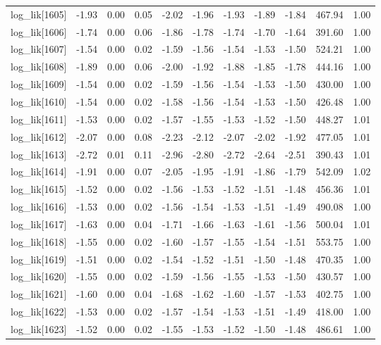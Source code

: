\begin{table}[ht]
\begin{tabular}{rrrrrrrrrrr}
  log\_lik[1605] & -1.93 & 0.00 & 0.05 & -2.02 & -1.96 & -1.93 & -1.89 & -1.84 & 467.94 & 1.00 \\ 
  log\_lik[1606] & -1.74 & 0.00 & 0.06 & -1.86 & -1.78 & -1.74 & -1.70 & -1.64 & 391.60 & 1.00 \\ 
  log\_lik[1607] & -1.54 & 0.00 & 0.02 & -1.59 & -1.56 & -1.54 & -1.53 & -1.50 & 524.21 & 1.00 \\ 
  log\_lik[1608] & -1.89 & 0.00 & 0.06 & -2.00 & -1.92 & -1.88 & -1.85 & -1.78 & 444.16 & 1.00 \\ 
  log\_lik[1609] & -1.54 & 0.00 & 0.02 & -1.59 & -1.56 & -1.54 & -1.53 & -1.50 & 430.00 & 1.00 \\ 
  log\_lik[1610] & -1.54 & 0.00 & 0.02 & -1.58 & -1.56 & -1.54 & -1.53 & -1.50 & 426.48 & 1.00 \\ 
  log\_lik[1611] & -1.53 & 0.00 & 0.02 & -1.57 & -1.55 & -1.53 & -1.52 & -1.50 & 448.27 & 1.01 \\ 
  log\_lik[1612] & -2.07 & 0.00 & 0.08 & -2.23 & -2.12 & -2.07 & -2.02 & -1.92 & 477.05 & 1.01 \\ 
  log\_lik[1613] & -2.72 & 0.01 & 0.11 & -2.96 & -2.80 & -2.72 & -2.64 & -2.51 & 390.43 & 1.01 \\ 
  log\_lik[1614] & -1.91 & 0.00 & 0.07 & -2.05 & -1.95 & -1.91 & -1.86 & -1.79 & 542.09 & 1.02 \\ 
  log\_lik[1615] & -1.52 & 0.00 & 0.02 & -1.56 & -1.53 & -1.52 & -1.51 & -1.48 & 456.36 & 1.01 \\ 
  log\_lik[1616] & -1.53 & 0.00 & 0.02 & -1.56 & -1.54 & -1.53 & -1.51 & -1.49 & 490.08 & 1.00 \\ 
  log\_lik[1617] & -1.63 & 0.00 & 0.04 & -1.71 & -1.66 & -1.63 & -1.61 & -1.56 & 500.04 & 1.01 \\ 
  log\_lik[1618] & -1.55 & 0.00 & 0.02 & -1.60 & -1.57 & -1.55 & -1.54 & -1.51 & 553.75 & 1.00 \\ 
  log\_lik[1619] & -1.51 & 0.00 & 0.02 & -1.54 & -1.52 & -1.51 & -1.50 & -1.48 & 470.35 & 1.00 \\ 
  log\_lik[1620] & -1.55 & 0.00 & 0.02 & -1.59 & -1.56 & -1.55 & -1.53 & -1.50 & 430.57 & 1.00 \\ 
  log\_lik[1621] & -1.60 & 0.00 & 0.04 & -1.68 & -1.62 & -1.60 & -1.57 & -1.53 & 402.75 & 1.00 \\ 
  log\_lik[1622] & -1.53 & 0.00 & 0.02 & -1.57 & -1.54 & -1.53 & -1.51 & -1.49 & 418.00 & 1.00 \\ 
  log\_lik[1623] & -1.52 & 0.00 & 0.02 & -1.55 & -1.53 & -1.52 & -1.50 & -1.48 & 486.61 & 1.00 \\ 

\end{tabular}
\end{table}
